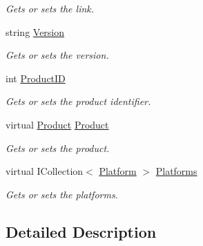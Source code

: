 \begin{DoxyCompactItemize}
\begin{DoxyCompactList}\small\item\em Gets or sets the link. \end{DoxyCompactList}\item 
string \hyperlink{class_open_1_1_g_i_1_1hypermart_1_1_data_transformation_objects_1_1_file_d_t_o_ac55a6e7062078277eed54e42b7c29d73}{Version}
\begin{DoxyCompactList}\small\item\em Gets or sets the version. \end{DoxyCompactList}\item 
int \hyperlink{class_open_1_1_g_i_1_1hypermart_1_1_data_transformation_objects_1_1_file_d_t_o_abd8d9083fbb95dac1e2781f2a8d4f8e9}{Product\+ID}
\begin{DoxyCompactList}\small\item\em Gets or sets the product identifier. \end{DoxyCompactList}\item 
virtual \hyperlink{class_open_1_1_g_i_1_1hypermart_1_1_models_1_1_product}{Product} \hyperlink{class_open_1_1_g_i_1_1hypermart_1_1_data_transformation_objects_1_1_file_d_t_o_aa587dd986d4c6d62d8bf5520d3a48e79}{Product}
\begin{DoxyCompactList}\small\item\em Gets or sets the product. \end{DoxyCompactList}\item 
virtual I\+Collection$<$ \hyperlink{class_open_1_1_g_i_1_1hypermart_1_1_models_1_1_platform}{Platform} $>$ \hyperlink{class_open_1_1_g_i_1_1hypermart_1_1_data_transformation_objects_1_1_file_d_t_o_a784824c36cab74d3bc03a8ae55d9a62a}{Platforms}
\begin{DoxyCompactList}\small\item\em Gets or sets the platforms. \end{DoxyCompactList}\end{DoxyCompactItemize}


\subsection{Detailed Description}





